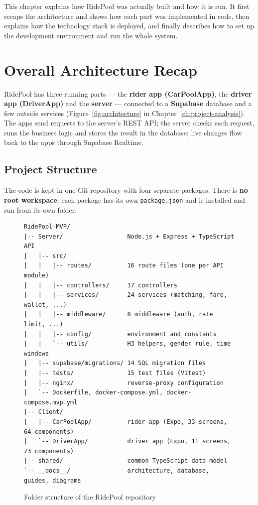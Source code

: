 
This chapter explains how RidePool was actually built and how it is run. It
first recaps the architecture and shows how each part was implemented in code,
then explains how the technology stack is deployed, and finally describes how
to set up the development environment and run the whole system.

\section{Overall Architecture Recap}
\label{sec:arch-recap}

RidePool has three running parts --- the \textbf{rider app (CarPoolApp)}, the
\textbf{driver app (DriverApp)} and the \textbf{server} --- connected to a
\textbf{Supabase} database and a few outside services
(Figure~\ref{fig:architecture} in Chapter~\ref{ch:project-analysis}). The apps
send requests to the server's REST API; the server checks each request, runs
the business logic and stores the result in the database; live changes flow
back to the apps through Supabase Realtime.

\subsection{Project Structure}
\label{subsec:structure}

The code is kept in one Git repository with four separate packages. There is
\textbf{no root workspace}: each package has its own \texttt{package.json} and
is installed and run from its own folder.

\begin{figure}[H]
\centering
\begin{minipage}{0.92\textwidth}
\small
\begin{verbatim}
RidePool-MVP/
|-- Server/                  Node.js + Express + TypeScript API
|   |-- src/
|   |   |-- routes/          16 route files (one per API module)
|   |   |-- controllers/     17 controllers
|   |   |-- services/        24 services (matching, fare, wallet, ...)
|   |   |-- middleware/      8 middleware (auth, rate limit, ...)
|   |   |-- config/          environment and constants
|   |   `-- utils/           H3 helpers, gender rule, time windows
|   |-- supabase/migrations/ 14 SQL migration files
|   |-- tests/               15 test files (Vitest)
|   |-- nginx/               reverse-proxy configuration
|   `-- Dockerfile, docker-compose.yml, docker-compose.mvp.yml
|-- Client/
|   |-- CarPoolApp/          rider app (Expo, 33 screens, 64 components)
|   `-- DriverApp/           driver app (Expo, 11 screens, 73 components)
|-- shared/                  common TypeScript data model
`-- __docs__/                architecture, database, guides, diagrams
\end{verbatim}
\end{minipage}
\caption{Folder structure of the RidePool repository}
\label{fig:structure}
\end{figure}

